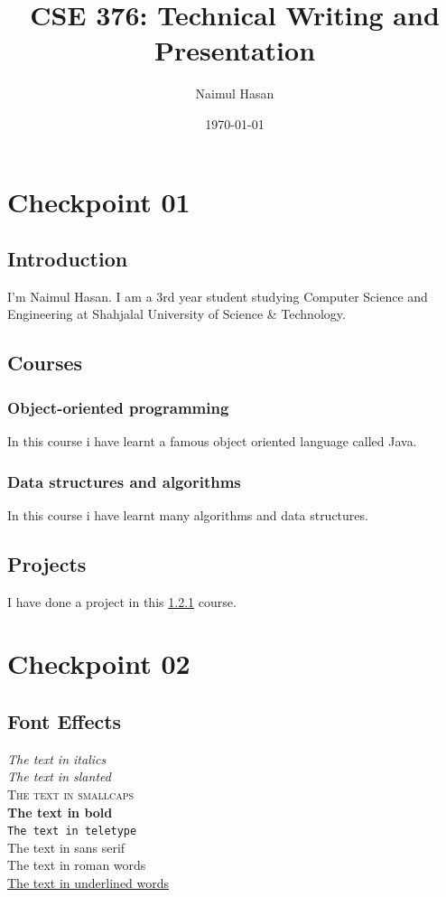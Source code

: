 \documentclass[a4paper,12pt]{article}
\begin{document}
\title{\textbf{CSE 376: Technical Writing and Presentation}}
\author{Naimul Hasan}
\date{\today}
\maketitle
{}
\tableofcontents
\newpage
{}

\section{Checkpoint 01}
\subsection{Introduction}
I'm Naimul Hasan. I am a 3rd year student studying Computer Science and
Engineering at Shahjalal University of Science \& Technology.
\subsection{Courses}
\subsubsection{Object-oriented programming}
\label{stage1}
In this course i have learnt a famous object oriented language called Java.
\subsubsection{Data structures and algorithms}
In this course i have learnt many algorithms and data structures.
\subsection{Projects}
I have done a project in this \ref{stage1} course.

\newpage
\section{Checkpoint 02}
\subsection{Font Effects}
\textit{The text in italics} \\
\textsl{The text in slanted} \\
\textsc{The text in smallcaps} \\
\textbf{The text in bold} \\
\texttt{The text in teletype} \\
\textsf{The text in sans serif} \\
\textrm{The text in roman words} \\
\underline{The text in underlined words} \\
\end{document}

